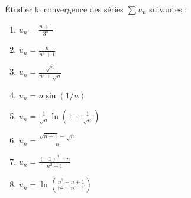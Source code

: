 \documentclass{book}
\begin{document}
\begin{Exercice}[Nature]
Étudier la convergence des séries $\sum u_n$ suivantes :

    \begin{enumerate}
        \item $u_n =  \frac{n+1}{3^n}$ 
        \item $u_n=\frac{n}{n^3+1}$
        \item $u_n=\frac{\sqrt n}{n^2+\sqrt n}$
        \item $u_n=n\sin(1/n)$
        \item $u_n=\frac{1}{\sqrt{n}}\ln\left(1+\frac{1}{\sqrt{n}}\right)$
        \item $u_n=\frac{\sqrt {n+1}-\sqrt{n}}{n}$
        \item $u_n=\frac{(-1)^n +n}{n^2+1}$
        \item $u_n=\ln\left(\frac{n^2+n+1}{n^2+n-1}\right)$
    \end{enumerate}





\end{Exercice}
\end{document}

